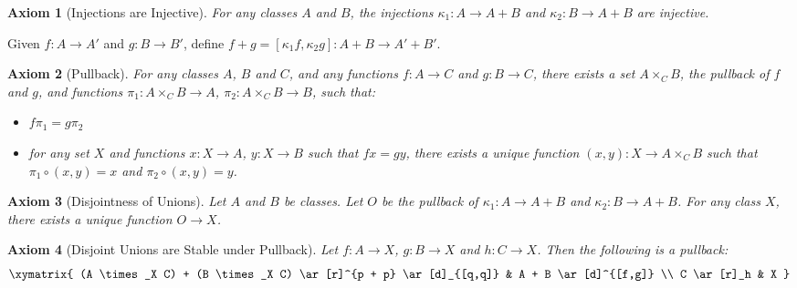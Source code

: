 \documentclass{book}
\newtheorem{ax}{Axiom}[chapter]
\begin{document}
\begin{ax}[Injections are Injective]
For any classes $A$ and $B$, the injections $\kappa_1 : A \rightarrow A + B$ and $\kappa_2 : B \rightarrow A + B$ are injective.
\end{ax}

\begin{df}
Given $f : A \rightarrow A'$ and $g : B \rightarrow B'$, define $f + g = [\kappa_1 f, \kappa_2 g] : A + B \rightarrow A' + B'$.
\end{df}

\begin{ax}[Pullback]
For any classes $A$, $B$ and $C$, and any functions $f : A \rightarrow C$ and $g : B \rightarrow C$, there exists a set $A \times_C B$, the \emph{pullback} of $f$ and $g$, and functions $\pi_1 : A \times_C B \rightarrow A$, $\pi_2 : A \times_C B \rightarrow B$, such that:
\begin{itemize}
\item $f \pi_1 = g \pi_2$
\item for any set $X$ and functions $x : X \rightarrow A$, $y : X \rightarrow B$ such that $fx = gy$, there exists a unique function $(x,y) : X \rightarrow A \times_C B$ such that $\pi_1 \circ (x,y) = x$ and $\pi_2 \circ (x,y) = y$.
\end{itemize}
\end{ax}

\begin{ax}[Disjointness of Unions]
Let $A$ and $B$ be classes. Let $O$ be the pullback of $\kappa_1 : A \rightarrow A + B$ and $\kappa_2 : B \rightarrow A + B$. For any class $X$, there exists a unique function $O \rightarrow X$.
\end{ax}

\begin{ax}[Disjoint Unions are Stable under Pullback]
Let $f : A \rightarrow X$, $g : B \rightarrow X$ and $h : C \rightarrow X$. Then the following is a pullback:
\[ \xymatrix{
(A \times_X C) + (B \times_X C) \ar[r]^{p + p} \ar[d]_{[q,q]} & A + B \ar[d]^{[f,g]} \\
C \ar[r]_h & X
} \]
\end{ax}
\end{document}
